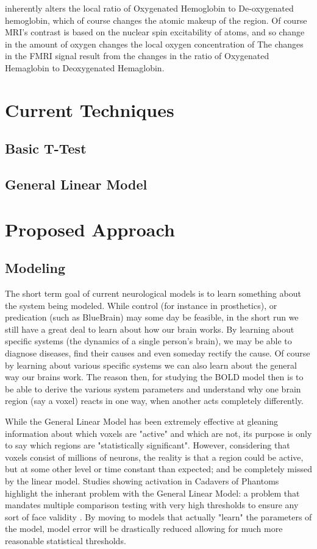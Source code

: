 \documentclass{article}
\begin{document}
inherently alters the local ratio of Oxygenated Hemoglobin
to De-oxygenated hemoglobin, which of course changes the atomic makeup of the
region. Of course MRI's contrast is based on the nuclear spin excitability of
atoms, and so change in the amount of oxygen changes the local oxygen concentration of 
The changes in the FMRI signal result from the changes in the ratio
of Oxygenated Hemaglobin to Deoxygenated Hemaglobin.

\section*{Current Techniques}
\subsection*{Basic T-Test}
\subsection*{General Linear Model}

\section*{Proposed Approach}
\subsection{Modeling}
The short term goal of current neurological models is to
learn something about the system being modeled.
While control (for instance in prosthetics), or predication
(such as BlueBrain) may some day be feasible, in the
short run we still have a great deal to learn about how our
brain works. By learning about specific systems (the dynamics
of a single person's brain), we may be able to diagnose diseases,
find their causes and even someday rectify the cause. Of course
by learning about various specific systems we can also learn 
about the general way our brains work. The reason then, for 
studying the BOLD model then is
to be able to derive the various system parameters and understand
why one brain region (say a voxel) reacts in one way, when another
acts completely differently.

While the General Linear Model has been extremely effective at
gleaning information about which voxels are "active" and which
are not, its purpose is only to say which regions are "statistically
significant". However, considering that voxels consist of millions
of neurons, the reality is that a
region could be active, but at some other level or time constant
than expected; and be completely missed by the linear model. 
Studies showing activation
in Cadavers of Phantoms highlight the inherant problem with the 
General Linear Model: a problem that mandates multiple
comparison testing with very high thresholds to ensure any 
sort of face validity \citep{drift}.
By moving to models that actually "learn" the 
parameters of the model, model error will be drastically
reduced allowing for much more reasonable statistical thresholds.
\end{document}
